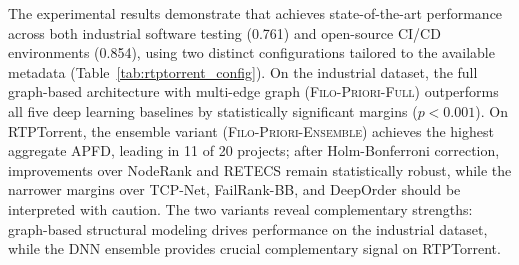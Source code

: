 The experimental results demonstrate that \filopriori{} achieves
state-of-the-art performance across both industrial software testing (0.761)
and open-source CI/CD environments (0.854), using two distinct
configurations tailored to the available metadata
(Table~\ref{tab:rtptorrent_config}). On the industrial dataset, the full
graph-based architecture with multi-edge graph (\textsc{Filo-Priori-Full})
outperforms all five deep learning baselines by statistically significant
margins ($p < 0.001$). On RTPTorrent, the ensemble variant
(\textsc{Filo-Priori-Ensemble}) achieves the highest aggregate APFD, leading
in 11 of 20 projects; after Holm-Bonferroni correction, improvements over
NodeRank and RETECS remain statistically robust, while the narrower margins
over TCP-Net, FailRank-BB, and DeepOrder should be interpreted with caution.
The two variants reveal complementary strengths:
graph-based structural modeling drives performance on the industrial dataset,
while the DNN ensemble provides crucial complementary signal on RTPTorrent.
